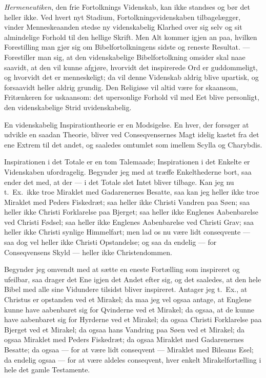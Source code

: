 \documentclass[12pt,a4paper]{book}
\newcommand{\opage}[1]{\marginnote{\footnotesize\textit{[#1]}}}
\begin{document}
\emph{Hermeneutiken}, den frie Fortolknings Videnskab, kan ikke standses og bør
det heller ikke. Ved hvert nyt Stadium, Fortolkningsvidenskaben tilbagelægger,
vinder Menneskeaanden stedse ny videnskabelig Klarhed over sig selv og sit
almindelige Forhold til den hellige Skrift. Men Alt kommer igjen an paa, hvilken
Forestilling man gjør sig om Bibelfortolkningens sidste og reneste Resultat. ---
Forestiller man sig, at den videnskabelige Bibelfortolkning omsider skal naae
saavidt, at den vil kunne afgjøre, hvorvidt det inspirerede Ord er
guddommeligt, og hvorvidt det er menneskeligt; da vil denne Videnskab aldrig
blive upartisk, og forsaavidt heller aldrig grundig. Den Religiøse vil altid
være for skaansom, Fritænkeren for uskaansom: det upersonlige Forhold vil med
Eet blive personligt, den videnskabelige Strid uvidenskabelig.

En videnskabelig Inspirationtheorie er en Modsigelse. En\-%
\opage{148}hver, der forsøger at udvikle en saadan Theorie, bliver ved Conseqvensernes Magt
idelig kastet fra det ene Extrem til det andet, og saaledes omtumlet som imellem
Scylla og Charybdis.

Inspirationen i det Totale er en tom Talemaade; Inspirationen i det Enkelte er
Videnskaben ufordragelig. Begynder jeg med at træffe Enkelthederne bort, saa
ender det med, at der --- i det Totale slet Intet bliver tilbage. Kan jeg nu
t.\ Ex.\ ikke troe Miraklet med Gadarenernes Besatte, saa kan jeg heller ikke
troe Miraklet med Peders Fiskedræt; saa heller ikke Christi Vandren paa Søen;
saa heller ikke Christi Forklarelse paa Bjerget; saa heller ikke Englenes
Aabenbarelse ved Christi Fødsel; saa heller ikke Englenes Aabenbarelse ved
Christi Grav; saa heller ikke Christi synlige Himmelfart; men lad os nu være
lidt conseqvente --- saa dog vel heller ikke Christi Opstandelse; og saa da
endelig --- for Conseqvensens Skyld --- heller ikke Christendommen.

Begynder jeg omvendt med at sætte en eneste Fortælling som inspireret og
ufeilbar, saa drager det Ene igjen det Andet efter sig, og det saaledes, at den
hele Bibel med alle sine Vidundere tilsidst bliver inspireret. Antager jeg
t.\ Ex., at Christus er opstanden ved et Mirakel; da maa jeg vel ogsaa antage,
at Englene kunne have aabenbaret sig for Qvinderne ved et Mirakel; da ogsaa, at
de kunne have aabenbaret sig for Hyrderne ved et Mirakel; da ogsaa Christi
Forklarelse paa Bjerget ved et Mirakel; da ogsaa hans Vandring paa Søen ved et
Mirakel; da ogsaa Miraklet med Peders Fiskedræt; da ogsaa Miraklet med
Gadarenernes Besatte; da ogsaa --- for at være lidt conseqvent --- Miraklet med
Bileams Esel; da endelig ogsaa --- for at være aldeles conseqvent, hver enkelt
Mirakelfortælling i hele det gamle Testamente.
\end{document}
